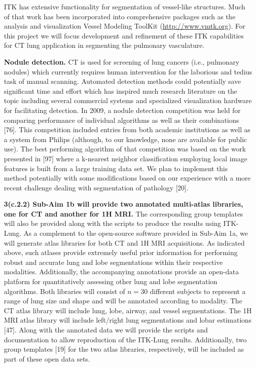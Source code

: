 \documentclass[11pt,]{article}
\begin{document}
ITK has extensive functionality for segmentation of vessel-like
structures. Much of that work has been incorporated into comprehensive
packages such as the analysis and visualization Vessel Modeling ToolKit
(\url{http://www.vmtk.org}). For this project we will focus development
and refinement of these ITK capabilities for CT lung application in
segmenting the pulmonary vasculature.

\textbf{Nodule detection.} CT is used for screening of lung cancers
(i.e., pulmonary nodules) which currently requires human intervention
for the laborious and tedius task of manual scanning. Automated
detection methods could potentially save significant time and effort
which has inspired much research literature on the topic including
several commercial systems and specialized visualization hardware for
facilitating detection. In 2009, a nodule detection competition was held
for comparing performance of individual algorithms as well as their
combinations {[}76{]}. This competition included entries from both
academic institutions as well as a system from Philips (although, to our
knowledge, none are available for public use). The best performing
algorithm of that competition was based on the work presented in
{[}97{]} where a k-nearest neighbor classification employing local image
features is built from a large training data set. We plan to implement
this method potentially with some modifications based on our experience
with a more recent challenge dealing with segmentation of pathology
{[}20{]}.

\textbf{3(c.2.2) Sub-Aim 1b will provide two annotated multi-atlas
libraries, one for CT and another for 1H MRI.} The corresponding group
templates will also be provided along with the scripts to produce the
results using ITK-Lung. As a complement to the open-source software
provided in Sub-Aim 1a, we will generate atlas libraries for both CT and
1H MRI acquisitions. As indicated above, such atlases provide extremely
useful prior information for performing robust and accurate lung and
lobe segmentations within their respective modalities. Additionally, the
accompanying annotations provide an open-data platform for
quantitatively assessing other lung and lobe segmentation algorithms.
Both libraries will consist of $n=30$ different subjects to represent a
range of lung size and shape and will be annotated according to
modality. The CT atlas library will include lung, lobe, airway, and
vessel segmentations. The 1H MRI atlas library will include left/right
lung segmentations and lobar estimations {[}47{]}. Along with the
annotated data we will provide the scripts and documentation to allow
reproduction of the ITK-Lung results. Additionally, two group templates
{[}19{]} for the two atlas libraries, respectively, will be included as
part of these open data sets.
\end{document}
